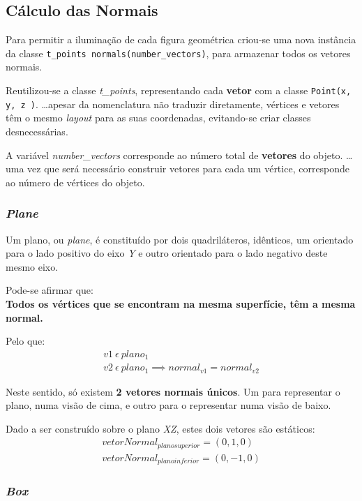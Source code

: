 \documentclass[relatorio.tex]{subfiles}
\begin{document}
\subsection{Cálculo das Normais} \label{subsec:normals}
Para permitir a iluminação de cada figura geométrica 
criou-se uma nova instância da classe 
\texttt{t_points normals(number_vectors)}, 
para armazenar todos os vetores normais.

Reutilizou-se a classe \textit{t\_points},
representando cada \textbf{vetor} com
a classe \texttt{Point(x, y, z )}.
\dots apesar da nomenclatura não traduzir
diretamente, vértices e vetores têm o mesmo 
\textit{layout} para as suas coordenadas, 
evitando-se criar classes desnecessárias.

A variável \textit{number\_vectors} corresponde ao 
número total de \textbf{vetores} do objeto.
\dots uma vez que será necessário construir vetores 
para cada um vértice, corresponde ao número de 
vértices do objeto.

\subsubsection{\textit{Plane}}

Um plano, ou \textit{plane}, é constituído por dois quadriláteros,
idênticos, um orientado para o lado positivo do eixo \textit{Y}
e outro orientado para o lado negativo deste mesmo eixo.

Pode-se afirmar que: \\
\textbf{Todos os vértices que se encontram na mesma superfície, 
têm a mesma normal.}

Pelo que:
\begin{eqnarray}
    v1\ \epsilon\ plano_{1} \\
    v2\ \epsilon\ plano_{1} \implies normal_{v1} = normal_{v2}
\end{eqnarray}

Neste sentido, só existem \textbf{2 vetores normais únicos}.
Um para representar o plano, numa visão de cima,
e outro para o representar numa visão de baixo.

Dado a ser construído sobre o plano \textit{XZ}, 
estes dois vetores são estáticos:
\begin{eqnarray}
    vetorNormal_{plano superior} = (0,1,0) \\
    vetorNormal_{plano inferior} = (0,-1,0) 
\end{eqnarray}

\subsubsection{\textit{Box}}
\end{document}
